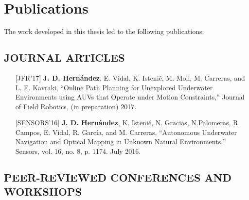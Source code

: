 \chapter*{Publications}%
\label{sec:publications}

The work developed in this thesis led to the following publications:


% 



\section*{JOURNAL ARTICLES}

\begin{itemize}
  \item[] [JFR'17] \textbf{J. D. Hern\'andez}, E. Vidal, K. Isteni\v{c}, M.
  Moll, M. Carreras, and L. E. Kavraki, ``Online Path Planning for Unexplored
  Underwater Environments using AUVs that Operate under Motion Constraints,''
  Journal of Field Robotics, (in preparation) 2017.
  \item[] [SENSORS'16] \textbf{J. D. Hern\'andez}, K. Isteni\v{c}, N. Gracias,
  N.Palomeras, R. Campos, E. Vidal, R. Garc\'ia, and M. Carreras, ``Autonomous
  Underwater Navigation and Optical Mapping in Unknown Natural Environments,''
  Sensors, vol. 16, no. 8, p. 1174. July 2016.
\end{itemize}

\section*{PEER-REVIEWED CONFERENCES AND WORKSHOPS}

